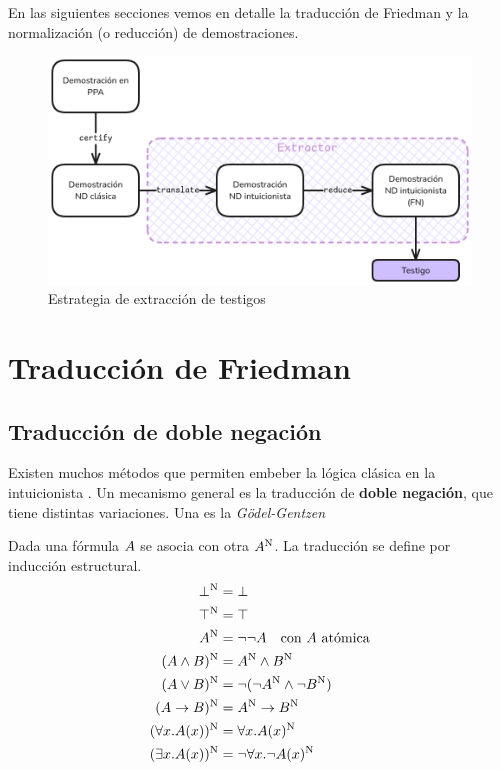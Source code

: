 En las siguientes secciones vemos en detalle la traducción de Friedman y la
normalización (o reducción) de demostraciones.

\begin{figure}
    \includegraphics[scale=0.35]{img/fri-extract-strategy.png}
    \centering
    \caption{Estrategia de extracción de testigos}
    \label{fri:fig:strat}
\end{figure}

\section{Traducción de Friedman}

\subsection{Traducción de doble negación}

Existen muchos métodos que permiten embeber la lógica clásica en la
intuicionista . Un mecanismo general es la traducción de
\textbf{doble negación}, que tiene distintas variaciones. Una es la
\textit{Gödel-Gentzen} \cite{Avigad1998-FEFOFD}

\begin{definition} Dada una fórmula $A$
se asocia con otra $A^{\text{N}}$. La traducción se define por inducción
estructural.
    \begin{align*}
        \bot^{\text{N}} &= \bot\\
        \top^{\text{N}} &= \top\\
        A^{\text{N}} &= \neg\neg A \quad \text{con $A$ atómica}\\
        (A \wedge B)^{\text{N}} &= A^{\text{N}} \wedge B^{\text{N}}\\
        (A \vee B)^{\text{N}} &= \neg(\neg A^{\text{N}} \wedge \neg B^{\text{N}})\\
        (A \to B)^{\text{N}} &= A^{\text{N}} \to B^{\text{N}}\\
        (\forall x . A(x))^{\text{N}} &= \forall x . A(x)^{\text{N}}\\
        (\exists x . A(x))^{\text{N}} &= \neg \forall x . \neg A(x)^{\text{N}}
    \end{align*}
\end{definition}


